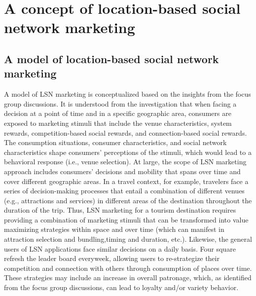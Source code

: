 \section{A concept of location-based social network marketing} 
\subsection{A model of location-based social network marketing }
A model of LSN marketing is conceptualized based on the insights from the focus group discussions. It is understood from the investigation that when facing a decision at a point of time and in a speciﬁc geographic area, consumers are exposed to marketing stimuli that include the venue characteristics, system rewards, competition-based social rewards, and connection-based social rewards. The consumption situations, consumer characteristics, and social network characteristics shape consumers’ perceptions of the stimuli, which would lead to a behavioral response (i.e., venue selection). At large, the scope of LSN marketing approach includes consumers’ decisions and mobility that spans over time and cover different geographic areas. In a travel context, for example, travelers face a series of decision-making processes that entail a combination of different venues (e.g., attractions and services) in different areas of the destination throughout the duration of the trip. Thus, LSN marketing for a tourism destination requires providing a combination of marketing stimuli that can be transformed into value maximizing strategies within space and over time (which can manifest in attraction selection and bundling,timing and duration, etc.). Likewise, the general users of LSN applications face similar decisions on a daily basis. Four square refresh the leader board everyweek, allowing users to re-strategize their competition and connection with others through consumption of places over time. These strategies may include an increase in overall patronage, which, as identiﬁed from the focus group discussions, can lead to loyalty and/or variety behavior.
